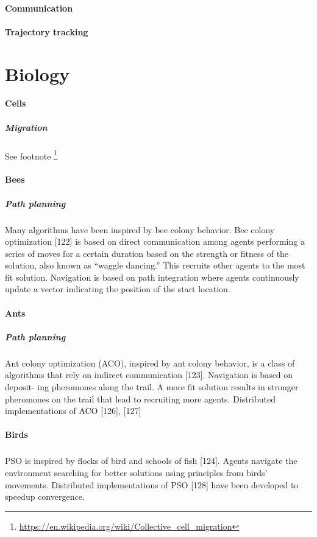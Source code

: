 \documentclass{article}
\begin{document}
	\paragraph{Communication}
	\paragraph{Trajectory tracking}
	
	\section{Biology}
		\paragraph{Cells}
			\subparagraph{Migration}
			See footnote \footnote{\url{https://en.wikipedia.org/wiki/Collective_cell_migration}}
		\paragraph{Bees}
			\subparagraph{Path planning}
			Many algorithms have been inspired by bee colony behavior.
			Bee colony optimization \cite{rizk-2018-decision-making-in-multiagent-systems-a-survey}[122] is based on direct communication among agents performing a series of moves for a certain
			duration based on the strength or fitness of the solution, also
			known as “waggle dancing.” This recruits other agents to the
			most fit solution. Navigation is based on path integration where
			agents continuously update a vector indicating the position of
			the start location.
		\paragraph{Ants}
			\subparagraph{Path planning}
			Ant colony optimization (ACO), inspired
			by ant colony behavior, is a class of algorithms that rely on
			indirect communication \cite{rizk-2018-decision-making-in-multiagent-systems-a-survey}[123]. Navigation is based on deposit-
			ing pheromones along the trail. A more fit solution results
			in stronger pheromones on the trail that lead to recruiting
			more agents. Distributed
			implementations of ACO \cite{rizk-2018-decision-making-in-multiagent-systems-a-survey}[126], \cite{rizk-2018-decision-making-in-multiagent-systems-a-survey}[127]
		\paragraph{Birds}
			\subparagraph{}PSO is inspired by flocks of bird and schools of fish \cite{rizk-2018-decision-making-in-multiagent-systems-a-survey}[124]. Agents navigate the environment searching for better solutions using principles from birds’ movements. Distributed
				implementations of PSO \cite{rizk-2018-decision-making-in-multiagent-systems-a-survey}[128] have
				been developed to speedup convergence.
				
\end{document}
